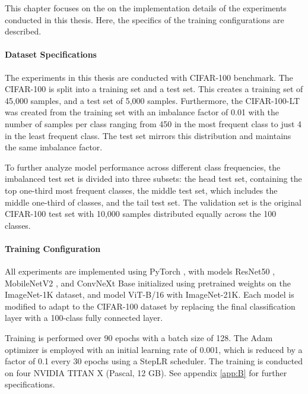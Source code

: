 
This chapter focuses on the on the implementation details of the experiments conducted in this thesis. Here, the specifics of the training configurations are described. 

\paragraph{Dataset Specifications}
The experiments in this thesis are conducted with CIFAR-100 \cite{krizhevsky2009learning} benchmark. The CIFAR-100 is split into a training set and a test set. This creates a training set of 45,000 samples, and a test set of 5,000 samples. Furthermore, the CIFAR-100-LT was created from the training set with an imbalance factor of 0.01 with the number of samples per class ranging from 450 in the most frequent class to just 4 in the least frequent class. The test set mirrors this distribution and maintains the same imbalance factor.

To further analyze model performance across different class frequencies, the imbalanced test set is divided into three subsets: the head test set, containing the top one-third most frequent classes, the middle test set, which includes the middle one-third of classes, and the tail test set. The validation set is the original CIFAR-100 test set with 10,000 samples distributed equally across the 100 classes.

\paragraph{Training Configuration}
All experiments are implemented using PyTorch \cite{paszke2019pytorchimperativestylehighperformance}, with models ResNet50 \cite{he2016}, MobileNetV2 \cite{sandler2018mobilenetv2}, and ConvNeXt Base \cite{todi2023convnext} initialized using pretrained weights on the ImageNet-1K dataset, and model ViT-B/16 \cite{dosovitskiy2021imageworth16x16words} with ImageNet-21K. Each model is modified to adapt to the CIFAR-100 dataset by replacing the final classification layer with a 100-class fully connected layer.

Training is performed over 90 epochs with a batch size of 128. The Adam optimizer \cite{kingma2017adammethodstochasticoptimization} is employed with an initial learning rate of 0.001, which is reduced by a factor of 0.1 every 30 epochs using a StepLR scheduler. The training is conducted on four NVIDIA TITAN X (Pascal, 12 GB). See appendix \ref{app:B} for further specifications.

